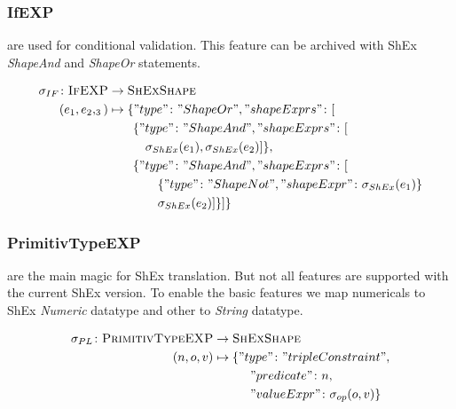 \documentclass[runningheads]{llncs}
\begin{document}
\subsubsection{IfEXP}
are used for conditional validation.
This feature can be archived with ShEx \textit{ShapeAnd} and \textit{ShapeOr} statements.
\begin{definition}
    \begin{align*}
        \sigma_{IF}\colon\textsc{IfEXP} & \to\textsc{ShExShape}                                                      \\
        (e_1, e_2, _3)                  & \mapsto\{"type"\colon"ShapeOr","shapeExprs"\colon[                         \\
                                        & \qquad\{"type"\colon"ShapeAnd","shapeExprs"\colon[                         \\
                                        & \qquad\quad\sigma_{ShEx}(e_1),\sigma_{ShEx}(e_2)]\},                       \\
                                        & \qquad\{"type"\colon"ShapeAnd","shapeExprs"\colon[                         \\
                                        & \qquad\qquad\{"type"\colon"ShapeNot","shapeExpr"\colon\sigma_{ShEx}(e_1)\} \\
                                        & \qquad\qquad\sigma_{ShEx}(e_2)]\}]\}                                       \\
    \end{align*}
\end{definition}
\subsubsection{PrimitivTypeEXP}
are the main magic for ShEx translation.
But not all features are supported with the current ShEx version.
To enable the basic features we map numericals to ShEx \textit{Numeric} datatype and other to \textit{String} datatype.
\begin{definition}
    \begin{align*}
        \sigma_{PL}\colon\textsc{PrimitivTypeEXP} & \to\textsc{ShExShape}                           \\
        (n,o,v)                                   & \mapsto\{"type"\colon"tripleConstraint",        \\
                                                  & \qquad\quad"predicate"\colon n,                 \\
                                                  & \qquad\quad "valueExpr"\colon\sigma_{op}(o,v)\}
    \end{align*}
\end{definition}
\end{document}
